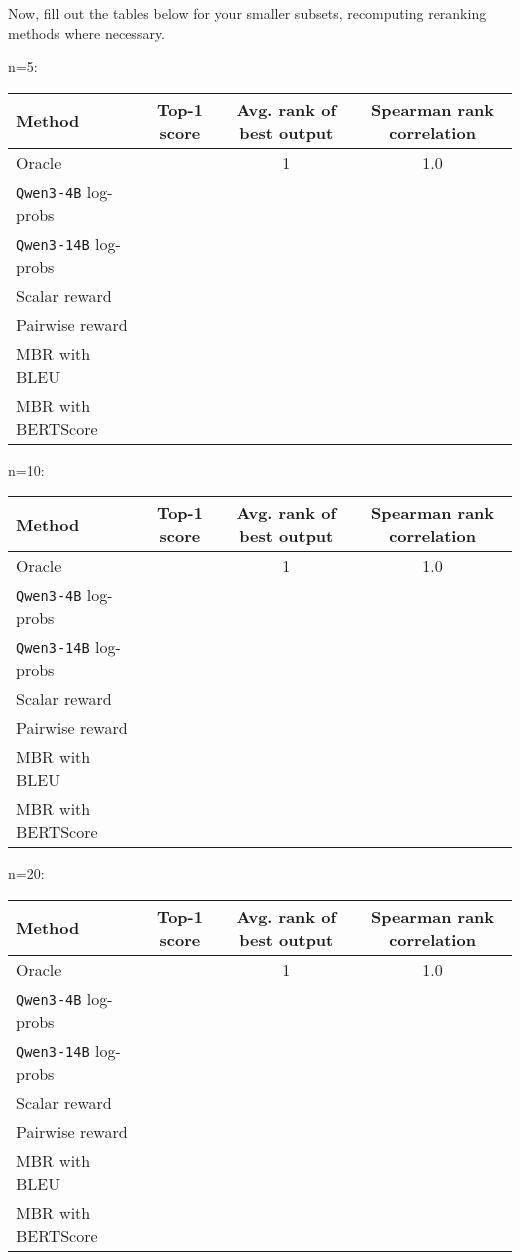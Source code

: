 \documentclass{article}
\begin{document}
Now, fill out the tables below for your smaller subsets, recomputing reranking methods where necessary.
\begin{solve}
n=5:\\
\begin{tabular}{lccc}
\toprule
Method & Top-1 score & Avg. rank of best output & Spearman rank correlation \\ \toprule
Oracle & & 1 & 1.0 \\ 
\texttt{Qwen3-4B} log-probs & & & \\ 
\texttt{Qwen3-14B} log-probs & & & \\
Scalar reward & & & \\
Pairwise reward & & & \\
MBR with BLEU & & & \\
MBR with BERTScore & & & \\
\bottomrule
\end{tabular}

n=10:\\
\begin{tabular}{lccc}
\toprule
Method & Top-1 score & Avg. rank of best output & Spearman rank correlation \\ \toprule
Oracle & & 1 & 1.0 \\ 
\texttt{Qwen3-4B} log-probs & & & \\ 
\texttt{Qwen3-14B} log-probs & & & \\
Scalar reward & & & \\
Pairwise reward & & & \\
MBR with BLEU & & & \\
MBR with BERTScore & & & \\
\bottomrule
\end{tabular}


n=20:\\
\begin{tabular}{lccc}
\toprule
Method & Top-1 score & Avg. rank of best output & Spearman rank correlation \\ \toprule
Oracle & & 1 & 1.0 \\ 
\texttt{Qwen3-4B} log-probs & & & \\ 
\texttt{Qwen3-14B} log-probs & & & \\
Scalar reward & & & \\
Pairwise reward & & & \\
MBR with BLEU & & & \\
MBR with BERTScore & & & \\
\bottomrule
\end{tabular}

\end{solve}
\end{document}
